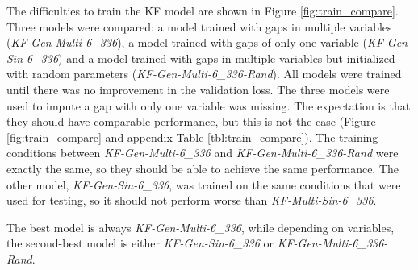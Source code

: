 \documentclass{article}
\begin{document}
The difficulties to train the KF model are shown in Figure \ref{fig:train_compare}.
Three models were compared: a model trained with gaps in multiple variables (\textit{KF-Gen-Multi-6\_336}), a model trained with gaps of only one variable (\textit{KF-Gen-Sin-6\_336}) and a model trained with gaps in multiple variables but initialized with random parameters (\textit{KF-Gen-Multi-6\_336-Rand}).
All models were trained until there was no improvement in the validation loss. The three models were used to impute a gap with only one variable was missing.
The expectation is that they should have comparable performance, but this is not the case (Figure \ref{fig:train_compare} and appendix Table \ref{tbl:train_compare}). The training conditions between \textit{KF-Gen-Multi-6\_336} and \textit{KF-Gen-Multi-6\_336-Rand} were exactly the same, so they should be able to achieve the same performance. The other model, \textit{KF-Gen-Sin-6\_336}, was trained on the same conditions that were used for testing, so it should not perform worse than \textit{KF-Multi-Sin-6\_336}.

The best model is always \textit{KF-Gen-Multi-6\_336}, while depending on variables, the second-best model is either \textit{KF-Gen-Sin-6\_336} or \textit{KF-Gen-Multi-6\_336-Rand}.
\end{document}
